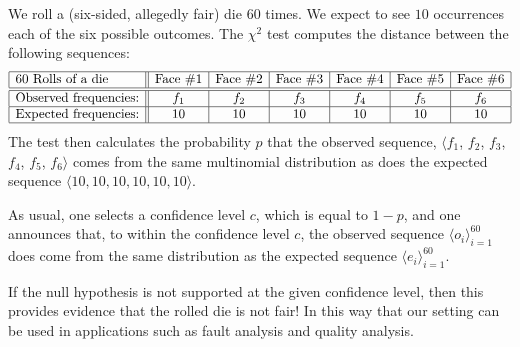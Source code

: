 We roll a (six-sided, allegedly fair) die $60$ times.  We expect to see $10$ occurrences each of the six possible outcomes.  The $\chi^2$ test computes the distance between the following sequences:
\[ \begin{array}{|l||c|c|c|c|c|c|}
\hline
\mbox{60 Rolls of a die}  &
\mbox{Face } \#1 &
\mbox{Face } \#2 &
\mbox{Face } \#3 &
\mbox{Face } \#4 &
\mbox{Face } \#5 &
\mbox{Face } \#6 \\
\hline \hline 
\mbox{Observed frequencies:}
  & f_1 & f_2 & f_3 & f_4 & f_5 & f_6 \\
\hline
\mbox{Expected frequencies:}
  & 10 & 10 & 10 & 10 & 10 & 10 \\
\hline
\end{array}
\]
The test then calculates the probability $p$ that the observed sequence, $\langle f_1$, $f_2$, $f_3$, $f_4$, $f_5$, $f_6 \rangle$ comes from the same multinomial distribution as does the expected sequence $\langle 10, 10, 10, 10, 10, 10 \rangle$. 

\smallskip

As usual, one selects a confidence level $c$, which is equal to $1-p$, and one announces that, to within the confidence level $c$, the observed sequence $\langle o_i \rangle_{i=1}^{60}$ does come from the same distribution as the expected sequence $\langle e_i \rangle_{i=1}^{60}$.

\smallskip

If the null hypothesis is not supported at the given confidence level, then this provides evidence that the rolled die is not fair!  In this way that our setting can be used in applications such as fault analysis and quality analysis.


